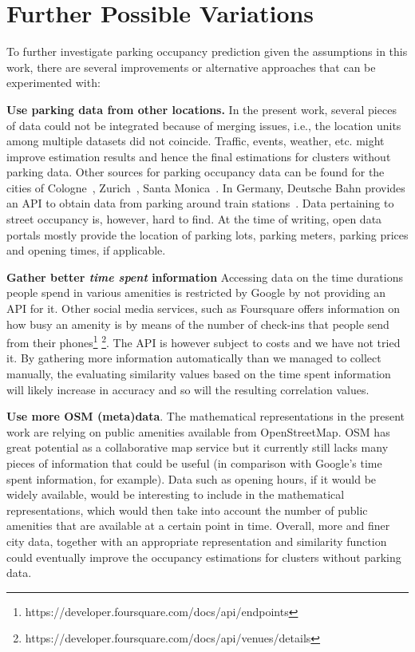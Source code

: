 	\section{Further Possible Variations}
	To further investigate parking occupancy prediction given the assumptions in this work, there are several improvements or alternative approaches that can be experimented with:
	
	\begin{romanlist}
		\item \textbf{Use parking data from other locations.}
		In the present work, several pieces of data could not be integrated because of merging issues, i.e., the location units among multiple datasets did not coincide.
		Traffic, events, weather, etc. might improve estimation results and hence the final estimations for clusters without parking data.
		Other sources for parking occupancy data can be found for the cities of Cologne~\cite{cologne_data}, Zurich~\cite{zurich_data}, Santa Monica~\cite{santa_monica_data}.
		In Germany, Deutsche Bahn provides an API to obtain data from parking around train stations~\cite{dbbahn_data}.
		Data pertaining to street occupancy is, however, hard to find.
		At the time of writing, open data portals mostly provide the location of parking lots, parking meters, parking prices and opening times, if applicable.  
		
		\item \textbf{Gather better \textit{time spent} information}
		Accessing data on the time durations people spend in various amenities is restricted by Google by not providing an API for it. Other social media services, such as Foursquare offers information on how busy an amenity is by means of the number of check-ins that people send from their phones\footnote{https://developer.foursquare.com/docs/api/endpoints}  \footnote{https://developer.foursquare.com/docs/api/venues/details}. The API is however subject to costs and we have not tried it. By gathering more information automatically than we managed to collect manually, the evaluating similarity values based on the time spent information will likely increase in accuracy and so will the resulting correlation values.  
		
		\item \textbf{Use more OSM (meta)data}.
		The mathematical representations in the present work are relying on public amenities available from OpenStreetMap.
		OSM has great potential as a collaborative map service but it currently still lacks many pieces of information that could be useful (in comparison with Google's time spent information, for example).
		Data such as opening hours, if it would be widely available, would be interesting to include in the mathematical representations, which would then take into account the number of public amenities that are available at a certain point in time.
		Overall, more and finer city data, together with an appropriate representation and similarity function could eventually improve the occupancy estimations for clusters without parking data. 
		

\end{romanlist}

